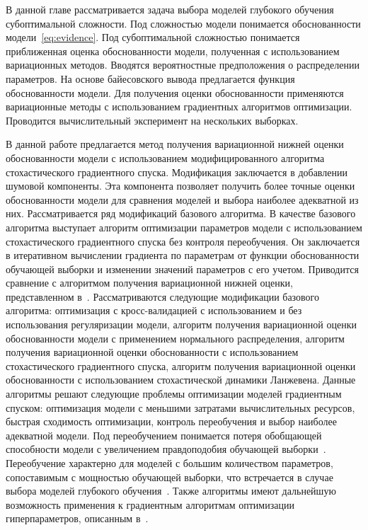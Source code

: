В данной главе рассматривается задача выбора моделей глубокого обучения субоптимальной сложности. Под сложностью модели понимается обоснованности модели~\eqref{eq:evidence}. Под субоптимальной сложностью понимается приближенная оценка обоснованности модели, полученная с использованием вариационных методов. Вводятся вероятностные предположения о распределении параметров. На основе байесовского вывода предлагается функция обоснованности модели. Для получения оценки обоснованности применяются вариационные методы с использованием градиентных алгоритмов оптимизации. Проводится вычислительный эксперимент на нескольких выборках.

В данной работе предлагается метод получения вариационной нижней оценки  обоснованности модели с использованием модифицированного алгоритма стохастического градиентного спуска. {Модификация заключается в добавлении шумовой компоненты. Эта компонента позволяет получить более точные оценки обоснованности модели для сравнения моделей и выбора наиболее адекватной из них. } Рассматривается ряд модификаций базового алгоритма. {В качестве базового алгоритма выступает алгоритм оптимизации параметров модели с использованием стохастического градиентного спуска без контроля переобучения. Он заключается в итеративном вычислении градиента по параметрам от функции обоснованности обучающей выборки и изменении значений параметров с его учетом.} Приводится сравнение с алгоритмом получения вариационной нижней оценки, представленном в~\cite{nips}. {Рассматриваются следующие модификации базового алгоритма:
оптимизация с кросс-валидацией с использованием и без использования регуляризации модели,
алгоритм получения вариационной оценки обоснованности модели с применением нормального распределения,
алгоритм получения вариационной оценки обоснованности с использованием стохастического градиентного спуска,
алгоритм получения вариационной оценки обоснованности с использованием стохастической динамики Ланжевена.}
 { Данные алгоритмы решают следующие проблемы оптимизации моделей  градиентным спуском: оптимизация модели с меньшими затратами вычислительных ресурсов, быстрая сходимость оптимизации, контроль переобучения и выбор наиболее адекватной модели.
Под переобучением понимается потеря обобщающей способности модели с увеличением правдоподобия обучающей выборки~\cite{mackay}. Переобучение характерно для моделей с большим количеством параметров, сопоставимым с мощностью обучающей выборки, что встречается в случае выбора моделей глубокого обучения~\cite{hinton_rbm, suts}.
}
Также алгоритмы имеют дальнейшую возможность применения к градиентным алгоритмам оптимизации гиперпараметров, описанным в~\cite{hyper}.

